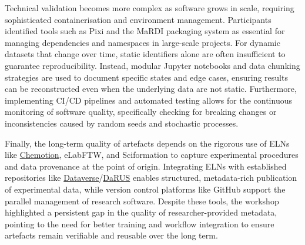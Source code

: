 \documentclass{eceasst}
\begin{document}
Technical validation becomes more complex as software grows in scale, requiring sophisticated containerisation and environment management.
Participants identified tools such as Pixi and the MaRDI packaging system as essential for managing dependencies and namespaces in large-scale projects.
For dynamic datasets that change over time, static identifiers alone are often insufficient to guarantee reproducibility.
Instead, modular Jupyter notebooks and data chunking strategies are used to document specific states and edge cases, ensuring results can be reconstructed even when the underlying data are not static.
Furthermore, implementing CI/CD pipelines and automated testing allows for the continuous monitoring of software quality, specifically checking for breaking changes or inconsistencies caused by random seeds and stochastic processes.

Finally, the long-term quality of artefacts depends on the rigorous use of ELNs like \href{https://chemotion.net/}{Chemotion}, eLabFTW, and Sciformation to capture  experimental procedures and data provenance at the point of origin.
Integrating ELNs with established repositories like \href{https://dataverse.org/}{Dataverse}/\href{https://darus.uni-stuttgart.de/dataverse/darus}{DaRUS} enables structured, metadata-rich publication of experimental data, while version control platforms like GitHub support the parallel management of research software.
Despite these tools, the workshop highlighted a persistent gap in the quality of researcher-provided metadata, pointing to the need for better training and workflow integration to ensure artefacts remain verifiable and reusable over the long term.
\end{document}
